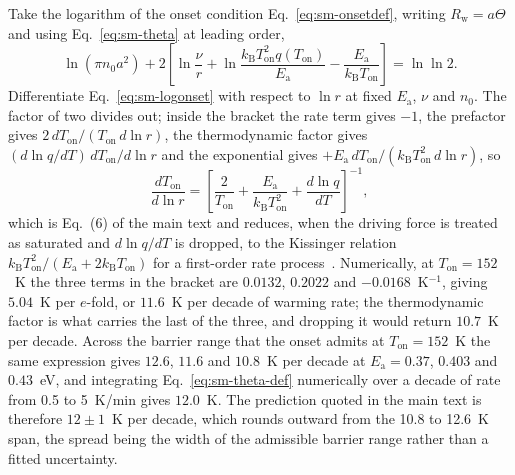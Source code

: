 \documentclass[reprint,twocolumn,prb,amsmath,amssymb,superscriptaddress,floatfix]{revtex4-2}
\newcommand{\kB}{k_{\mathrm{B}}}
\newcommand{\Ea}{E_{\mathrm{a}}}
\newcommand{\Ton}{T_{\mathrm{on}}}
\begin{document}
Take the logarithm of the onset condition Eq.~\eqref{eq:sm-onsetdef}, writing
$R_{\mathrm{w}}=a\Theta$ and using Eq.~\eqref{eq:sm-theta} at leading order,
\begin{equation}
  \ln(\pi n_{0}a^{2})
  +2\left[\ln\frac{\nu}{r}+\ln\frac{\kB\Ton^{2}q(\Ton)}{\Ea}-\frac{\Ea}{\kB\Ton}\right]
  =\ln\ln2 .
  \label{eq:sm-logonset}
\end{equation}
Differentiate Eq.~\eqref{eq:sm-logonset} with respect to $\ln r$ at fixed $\Ea$, $\nu$ and
$n_{0}$. The factor of two divides out; inside the bracket the rate term gives $-1$, the
prefactor gives $2\,d\Ton/(\Ton\,d\ln r)$, the thermodynamic factor gives
$(d\ln q/dT)\,d\Ton/d\ln r$ and the exponential gives
$+\Ea\,d\Ton/(\kB\Ton^{2}\,d\ln r)$, so
\begin{equation}
  \frac{d\Ton}{d\ln r}
  = \left[\frac{2}{\Ton}+\frac{\Ea}{\kB\Ton^{2}}+\frac{d\ln q}{dT}\right]^{-1},
  \label{eq:sm-rateshift}
\end{equation}
which is Eq.~(6) of the main text and reduces, when the driving force is treated as saturated
and $d\ln q/dT$ is dropped, to the Kissinger relation $\kB\Ton^{2}/(\Ea+2\kB\Ton)$ for a
first-order rate process~\cite{Kissinger1957}. Numerically, at $\Ton=152$~K the three terms in
the bracket are $0.0132$, $0.2022$ and $-0.0168$~K$^{-1}$, giving $5.04$~K per $e$-fold, or
$11.6$~K per decade of warming rate; the thermodynamic factor is what carries the last of the
three, and dropping it would return $10.7$~K per decade. Across the barrier range that the
onset admits at $\Ton=152$~K the same expression gives $12.6$, $11.6$ and $10.8$~K per decade
at $\Ea=0.37$, $0.403$ and $0.43$~eV, and integrating Eq.~\eqref{eq:sm-theta-def} numerically
over a decade of rate from 0.5 to 5~K/min gives $12.0$~K. The prediction quoted in the main
text is therefore $12\pm1$~K per decade, which rounds outward from the 10.8 to 12.6~K span, the
spread being the width of the admissible barrier range rather than a fitted uncertainty.
\end{document}
